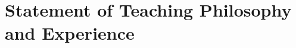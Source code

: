 \documentclass[10pt]{article} %
\begin{document}
%


\clearpage
\section{Statement of Teaching Philosophy and Experience}
\end{document}
